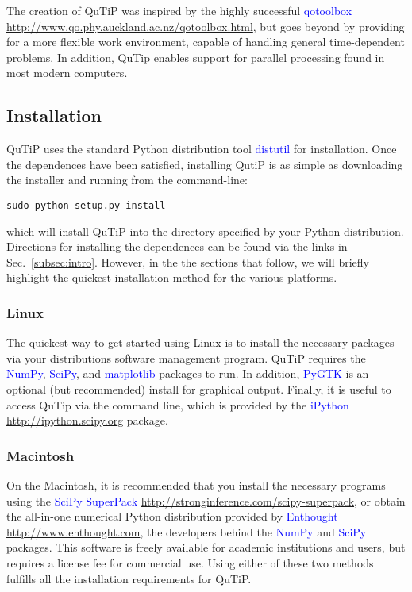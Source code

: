 \documentclass[11pt,letterpaper]{article}
\begin{document}
The creation of QuTiP was inspired by the highly successful \textcolor{blue}{qotoolbox} \href{http://www.qo.phy.auckland.ac.nz/qotoolbox.html}{http://www.qo.phy.auckland.ac.nz/qotoolbox.html}, but goes beyond by providing for a more flexible work environment, capable of handling general time-dependent problems.  In addition, QuTip enables support for parallel processing found in most modern computers.

\subsection{Installation}\label{subsec:install}
QuTiP uses the standard Python distribution tool \textcolor{blue}{distutil} for installation.  Once the dependences have been satisfied, installing QutiP is as simple as downloading the installer and running from the command-line:
\begin{lstlisting}[basicstyle=\small,keywordstyle=\color{red}\bfseries,numberstyle=\tiny,firstnumber=last] 
  sudo python setup.py install
\end{lstlisting}
which will install QuTiP into the directory specified by your Python distribution.  Directions for installing the dependences can be found via the links in Sec.~\ref{subsec:intro}.  However, in the the sections that follow, we will briefly highlight the quickest installation method for the various platforms.  

\subsubsection{Linux}\label{subsubsec:linux}
The quickest way to get started using Linux is to install the necessary packages via your distributions software management program.  QuTiP requires the \textcolor{blue}{NumPy},  \textcolor{blue}{SciPy}, and  \textcolor{blue}{matplotlib} packages to run.  In addition,  \textcolor{blue}{PyGTK} is an optional (but recommended) install for graphical output.  Finally, it is useful to access QuTip via the command line, which is provided by the  \textcolor{blue}{iPython} \href{http://ipython.scipy.org}{http://ipython.scipy.org} package. 

\subsubsection{Macintosh}\label{subsubsec:mac}
On the Macintosh, it is recommended that you install the necessary programs using the \textcolor{blue}{SciPy SuperPack} \href{http://stronginference.com/scipy-superpack}{http://stronginference.com/scipy-superpack}, or obtain the all-in-one numerical Python distribution provided by \textcolor{blue}{Enthought} \href{http://www.enthought.com}{http://www.enthought.com}, the developers behind the \textcolor{blue}{NumPy} and \textcolor{blue}{SciPy} packages.  This software is freely available for academic institutions and users, but requires a license fee for commercial use.  Using either of these two methods fulfills all the installation requirements for QuTiP.
\end{document}
